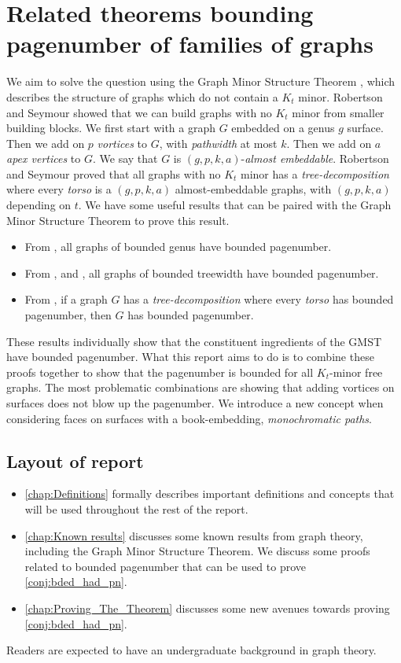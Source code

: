 \section{Related theorems bounding pagenumber of families of graphs}
We aim to solve the question using the Graph Minor Structure Theorem \cite{robertsonGraphMinorsXVI2003}, which describes the structure of graphs which do not contain a \(K_t\) minor.
Robertson and Seymour showed that we can build graphs with no \(K_t\) minor from smaller building blocks. We first start with a graph \(G\) embedded on a genus \(g\) surface. Then we add on \(p\) \textit{vortices} to \(G\), with \textit{pathwidth} at most \(k\). Then we add on \(a\) \textit{apex vertices} to \(G\). We say that \(G\) is \((g, p, k, a)\)-\textit{almost embeddable}. Robertson and Seymour \cite{robertsonGraphMinorsXVI2003} proved that all graphs with no \(K_t\) minor has a \textit{tree-decomposition} where every \textit{torso} is a \((g, p, k, a)\) almost-embeddable graphs, with \((g, p, k, a)\) depending on \(t\).
We have some useful results that can be paired with the Graph Minor Structure Theorem to prove this result.
\begin{itemize}
	\item From \textcite{heathPagenumberGenusGraphs1992}, all graphs of bounded genus have bounded pagenumber.
	\item From \textcite{ganleyPagenumberTrees2001}, and \textcite{dujmovicGraphTreewidthGeometric2007}, all graphs of bounded treewidth have bounded pagenumber.
	\item From \textcite{hickingbothamStackNumberCliqueSum2023}, if a graph \(G\) has a \textit{tree-decomposition} where every \textit{torso} has bounded pagenumber, then \(G\) has bounded pagenumber.
\end{itemize}
These results individually show that the constituent ingredients of the GMST have bounded pagenumber. What this report aims to do is to combine these proofs together to show that the pagenumber is bounded for all $K_t$-minor free graphs.
The most problematic combinations are showing that adding vortices on surfaces does not blow up the pagenumber. We introduce a new concept when considering faces on surfaces with a book-embedding, \textit{monochromatic paths}.
\subsection{Layout of report}
\begin{itemize}
	\item \cref{chap:Definitions} formally describes important definitions and concepts that will be used throughout the rest of the report.
	\item \cref{chap:Known results} discusses some known results from graph theory, including the Graph Minor Structure Theorem. We discuss some proofs related to bounded pagenumber that can be used to prove \cref{conj:bded_had_pn}.

	\item \cref{chap:Proving_The_Theorem} discusses some new avenues towards proving \cref{conj:bded_had_pn}.
\end{itemize}
Readers are expected to have an undergraduate background in graph theory.
